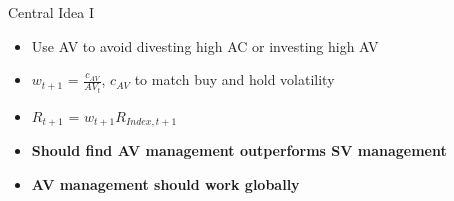 \documentclass{beamer}
\begin{document}
\begin{frame}{Central Idea I}
	\begin{itemize}[<+->]
		\item Use AV to avoid divesting high AC or investing high AV
		\item $w_{t+1}$ = $\frac{c_{AV}}{AV_{t}}$, $c_{AV}$ to match buy and hold volatility
		\item $R_{t+1}$ = $w_{t+1}R_{Index,t+1}$
		\item \textbf{Should find AV management outperforms SV management}
		\item \textbf{AV management should work globally}
	\end{itemize}
\end{frame}
\end{document}
